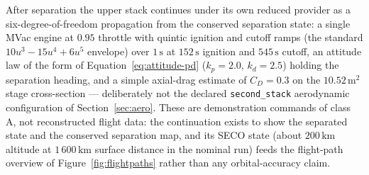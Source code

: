 After separation the upper stack continues under its own reduced provider
as a six-degree-of-freedom propagation from the conserved separation
state: a single MVac engine at $0.95$ throttle with quintic ignition and
cutoff ramps (the standard $10u^3 - 15u^4 + 6u^5$ envelope) over
$1\,\mathrm{s}$ at $152\,\mathrm{s}$ ignition and $545\,\mathrm{s}$
cutoff, an attitude law of the form of Equation~\eqref{eq:attitude-pd}
($k_p = 2.0$, $k_d = 2.5$) holding the separation heading, and a simple
axial-drag estimate of $C_D = 0.3$ on the $10.52\,\mathrm{m^2}$ stage
cross-section --- deliberately not the declared \texttt{second\_stack}
aerodynamic configuration of Section~\ref{sec:aero}. These are
demonstration commands of class A, not reconstructed flight data: the
continuation exists to show the separated state and the conserved
separation map, and its SECO state (about $200\,\mathrm{km}$ altitude at
$1\,600\,\mathrm{km}$ surface distance in the nominal run) feeds the
flight-path overview of Figure~\ref{fig:flightpaths} rather than any
orbital-accuracy claim.

